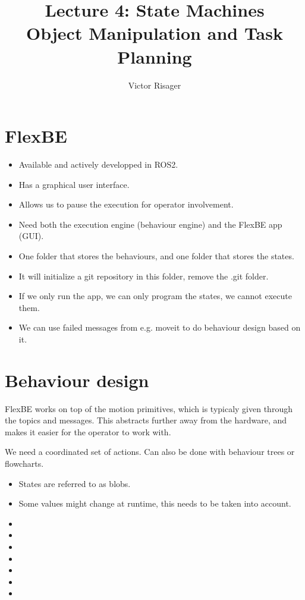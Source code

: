 \documentclass[a4paper]{article}
\title{Lecture 4: State Machines  \\
	\large Object Manipulation and Task Planning}
\author{Victor Risager}
\begin{document}
\maketitle

\section{FlexBE}
\begin{itemize}
	\item Available and actively developped in ROS2.
		\item Has a graphical user interface.
		\item Allows us to pause the execution for operator involvement. 
		\item Need both the execution engine (behaviour engine) and the FlexBE app (GUI).
		\item One folder that stores the behaviours, and one folder that stores the states.
		\item It will initialize a git repository in this folder, remove the .git folder. 
		\item If we only run the app, we can only program the states, we cannot execute them.
		\item We can use failed messages from e.g. moveit to do behaviour design based on it. 
\end{itemize}

\section{Behaviour design}
FlexBE works on top of the motion primitives, which is typicaly given through the topics and messages. This abstracts further away from the hardware, and makes it easier for the operator to work with. 

We need a coordinated set of actions. Can also be done with behaviour trees or flowcharts.


\begin{itemize}
	\item States are referred to as blobs. 
	\item Some values might change at runtime, this needs to be taken into account. 
	\item 
	\item 
	\item 
	\item 
	\item 
	\item 
	\item 
\end{itemize}
\end{document}
